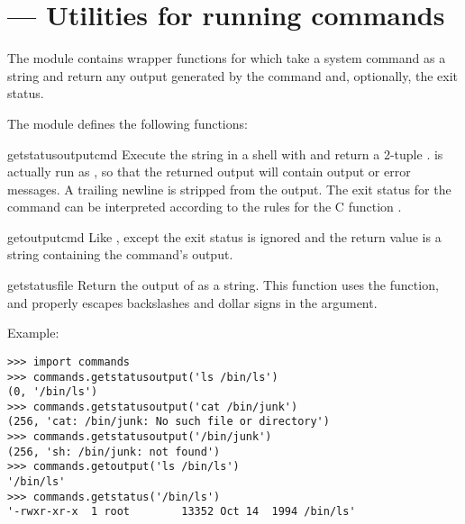 \section{ ---
         Utilities for running commands}



The  module contains wrapper functions for
 which take a system command as a string and
return any output generated by the command and, optionally, the exit
status.

The  module defines the following functions:


\begin{funcdesc}{getstatusoutput}{cmd}
Execute the string  in a shell with  and
return a 2-tuple .   is
actually run as , so that the returned
output will contain output or error messages. A trailing newline is
stripped from the output. The exit status for the command can be
interpreted according to the rules for the C function
.
\end{funcdesc}

\begin{funcdesc}{getoutput}{cmd}
Like , except the exit status is ignored
and the return value is a string containing the command's output.  
\end{funcdesc}

\begin{funcdesc}{getstatus}{file}
Return the output of  as a string.  This
function uses the  function, and properly
escapes backslashes and dollar signs in the argument.
\end{funcdesc}

Example:

\begin{verbatim}
>>> import commands
>>> commands.getstatusoutput('ls /bin/ls')
(0, '/bin/ls')
>>> commands.getstatusoutput('cat /bin/junk')
(256, 'cat: /bin/junk: No such file or directory')
>>> commands.getstatusoutput('/bin/junk')
(256, 'sh: /bin/junk: not found')
>>> commands.getoutput('ls /bin/ls')
'/bin/ls'
>>> commands.getstatus('/bin/ls')
'-rwxr-xr-x  1 root        13352 Oct 14  1994 /bin/ls'
\end{verbatim}

